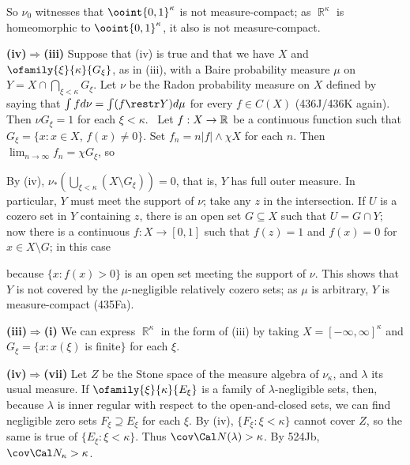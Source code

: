 {\noindent So $\nu_0$ witnesses that $\ooint{0,1}^{\kappa}$ is
not measure-compact;  as $\BbbR^{\kappa}$ is homeomorphic to
$\ooint{0,1}^{\kappa}$, it also is not measure-compact.

\medskip

{\bf (iv)$\Rightarrow$(iii)} Suppose that (iv) is true and that we have
$X$ and $\ofamily{\xi}{\kappa}{G_{\xi}}$, as in (iii), with a Baire
probability measure $\mu$ on $Y=X\cap\bigcap_{\xi<\kappa}G_{\xi}$.   Let
$\nu$ be the Radon probability measure on $X$ defined by saying that
$\int fd\nu=\int(f\restr Y)d\mu$ for every $f\in C(X)$ (436J/436K again).
Then $\nu G_{\xi}=1$ for each $\xi<\kappa$.   \Prf\ Let $f:X\to\Bbb R$
be a continuous function such that $G_{\xi}=\{x:x\in X$, $f(x)\ne 0\}$.
Set $f_n=n|f|\wedge\chi X$ for each $n$.   Then
$\lim_{n\to\infty}f_n=\chi G_{\xi}$, so


\noindent By (iv), $\nu_*(\bigcup_{\xi<\kappa}(X\setminus G_{\xi}))=0$,
that is, $Y$ has full outer measure.   In particular, $Y$ must meet the
support of $\nu$;  take any $z$ in the intersection.   If $U$ is a
cozero set in $Y$ containing $z$, there is an open set $G\subseteq X$
such that $U=G\cap Y$;  now there is a continuous $f:X\to[0,1]$ such
that $f(z)=1$ and $f(x)=0$ for $x\in X\setminus G$;  in this case


\noindent because $\{x:f(x)>0\}$ is an open set meeting the support of
$\nu$.   This shows that $Y$ is not covered by the $\mu$-negligible
relatively cozero sets;  as $\mu$ is arbitrary, $Y$ is measure-compact
(435Fa).

\medskip

{\bf (iii)$\Rightarrow$(i)} We can express $\BbbR^{\kappa}$ in the form of
(iii) by taking $X=[-\infty,\infty]^{\kappa}$ and
$G_{\xi}=\{x:x(\xi)$ is finite$\}$ for each $\xi$.

\medskip

{\bf (iv)$\Rightarrow$(vii)} Let $Z$ be the Stone space of the measure
algebra of $\nu_{\kappa}$, and $\lambda$ its usual measure.   If
$\ofamily{\xi}{\kappa}{E_{\xi}}$ is a family of $\lambda$-negligible
sets, then, because $\lambda$ is inner regular with respect to the
open-and-closed sets, we can find negligible zero sets
$F_{\xi}\supseteq E_{\xi}$ for each $\xi$.   By (iv),
$\{F_{\xi}:\xi<\kappa\}$ cannot cover $Z$, so the same is true of
$\{E_{\xi}:\xi<\kappa\}$.   Thus $\cov\Cal N(\lambda)>\kappa$.   By
524Jb, $\cov\Cal N_{\kappa}>\kappa$.

}
